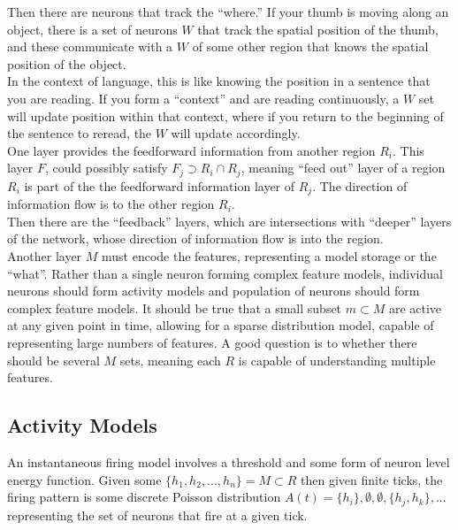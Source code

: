 \documentclass{article}
\begin{document}
Then there are neurons that track the ``where.'' If your thumb is moving along an object, there is a set of neurons $W$ that track the spatial position of the thumb, and these communicate with a $W$ of some other region that knows the spatial position of the object. \\

In the context of language, this is like knowing the position in a sentence that you are reading. If you form a ``context'' and are reading continuously, a $W$ set will update position within that context, where if you return to the beginning of the sentence to reread, the $W$ will update accordingly. \\

One layer provides the feedforward information from another region $R_i$. This layer $F$, could possibly satisfy $F_j \supset R_i \cap R_j$, meaning ``feed out'' layer of a region $R_i$ is part of the the feedforward information layer of $R_j$. The direction of information flow is to the other region  $R_i$.\\

Then there are the ``feedback'' layers, which are intersections with ``deeper'' layers of the network, whose direction of information flow is into the region. \\

Another layer $M$ must encode the features, representing a model storage or the ``what''. Rather than a single neuron forming complex feature models, individual neurons should form activity models and population of neurons should form complex feature models. It should be true that a small subset $m \subset M$ are active at any given point in time, allowing for a sparse distribution model, capable of representing large numbers of features. A good question is to whether there should be several $M$ sets, meaning each $R$ is capable of understanding multiple features. 


\subsection{Activity Models}
An instantaneous firing model involves a threshold and some form of neuron level energy function. Given some $\{ h_1, h_2,...,h_n \} = M \subset R$ then given finite ticks, the firing pattern is some discrete Poisson distribution $A(t) = \{h_i\} , \emptyset, \emptyset, \{h_j,h_k\},...$ representing the set of neurons that fire at a given tick. \\
\end{document}
